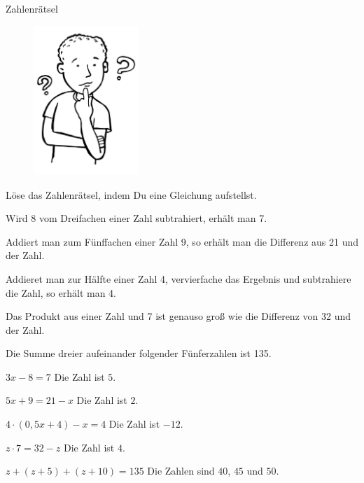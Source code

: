\documentclass[12pt,a5paper,landscape]{scrartcl}
\begin{document}
\begin{karte1}{Zahlenrätsel}
	\begin{figure}
		\includegraphics[width=4cm]{7.4-LT-Abb_Nachdenken}
	\end{figure}
	
	Löse das Zahlenrätsel, indem Du eine Gleichung aufstellst.
	
	\begin{enumeratea}
		\item Wird $8$ vom Dreifachen einer Zahl subtrahiert, erhält man 7.
		\item Addiert man zum Fünffachen einer Zahl 9, so erhält man die Differenz aus 21 und der Zahl.
		\item Addieret man zur Hälfte einer Zahl 4, vervierfache das Ergebnis und subtrahiere die Zahl, so erhält man 4.
		\item Das Produkt aus einer Zahl und 7 ist genauso groß wie die Differenz von 32 und der Zahl.
		\item Die Summe dreier aufeinander folgender Fünferzahlen ist 135.
	\end{enumeratea}
\end{karte1}

\begin{loesungskarte}
	\begin{enumeratea}
		\item $3x - 8 = 7$ \hspace{1cm} Die Zahl ist $5$.
		\item $5x + 9 = 21 - x$ \hspace{1cm} Die Zahl ist $2$.
		\item $4\cdot (0,5x + 4) - x = 4$ \hspace{1cm} Die Zahl ist $-12$.
		\item $z\cdot  7 = 32 - z$  \hspace{1cm} Die Zahl ist $4$.
		\item $z + (z+5) + (z+10) = 135$ \hspace{1cm} Die Zahlen sind $40$, $45$ und $50$.
	\end{enumeratea}
\end{loesungskarte}
\end{document}
